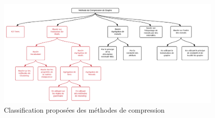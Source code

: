  \begin{figure}[H]
		\includegraphics[scale=0.6]{./ressources/image/classif.png}
		\caption{Classification proposées des méthodes de compression}
	\end{figure}





